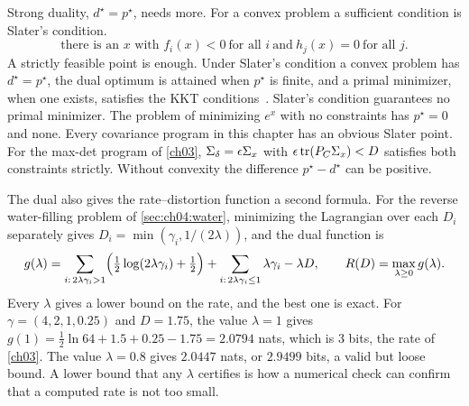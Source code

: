 Strong duality, $d^\star=p^\star$, needs more. For a convex problem a sufficient condition is Slater's condition.
\begin{equation}\label{eq:ch04:slater}
\text{there is an }x\text{ with } f_i(x)<0\ \text{for all }i\ \text{and}\ h_j(x)=0\ \text{for all }j .
\end{equation}
A strictly feasible point is enough. Under Slater's condition a convex problem has $d^\star=p^\star$, the dual optimum is attained when $p^\star$ is finite, and a primal minimizer, when one exists, satisfies the KKT conditions~\cite{boydvandenberghe2004}. Slater's condition guarantees no primal minimizer. The problem of minimizing $e^x$ with no constraints has $p^\star=0$ and none. Every covariance program in this chapter has an obvious Slater point. For the max-det program of \cref{ch03}, $\Sigma_\delta=\epsilon\Sigma_x$ with $\epsilon\operatorname{tr}(P_C\Sigma_x)<D$ satisfies both constraints strictly. Without convexity the difference $p^\star-d^\star$ can be positive.

The dual also gives the rate--distortion function a second formula. For the reverse water-filling problem of \cref{sec:ch04:water}, minimizing the Lagrangian over each $D_i$ separately gives $D_i=\min(\gamma_i,1/(2\lambda))$, and the dual function is
\begin{equation}\label{eq:ch04:rd-dual}
g(\lambda)=\sum_{i:\,2\lambda\gamma_i>1}\Bigl(\tfrac12\log(2\lambda\gamma_i)+\tfrac12\Bigr)+\sum_{i:\,2\lambda\gamma_i\le1}\lambda\gamma_i-\lambda D,
\qquad R(D)=\max_{\lambda\ge0}g(\lambda).
\end{equation}
Every $\lambda$ gives a lower bound on the rate, and the best one is exact. For $\gamma=(4,2,1,0.25)$ and $D=1.75$, the value $\lambda=1$ gives $g(1)=\frac12\ln64+1.5+0.25-1.75=2.0794$ nats, which is $3$ bits, the rate of \cref{ch03}. The value $\lambda=0.8$ gives $2.0447$ nats, or $2.9499$ bits, a valid but loose bound. A lower bound that any $\lambda$ certifies is how a numerical check can confirm that a computed rate is not too small.


